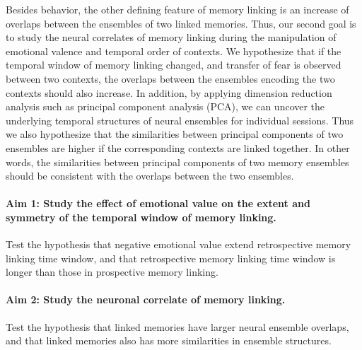 \documentclass[master.tex]{subfiles}
\begin{document}
Besides behavior, the other defining feature of memory linking is an increase of
overlaps between the ensembles of two linked memories. Thus, our second goal is
to study the neural correlates of memory linking during the manipulation of
emotional valence and temporal order of contexts. We hypothesize that if the
temporal window of memory linking changed, and transfer of fear is observed
between two contexts, the overlaps between the ensembles encoding the two
contexts should also increase. In addition, by applying dimension reduction
analysis such as principal component analysis (PCA), we can uncover the
underlying temporal structures of neural ensembles for individual sessions. Thus
we also hypothesize that the similarities between principal components of two
ensembles are higher if the corresponding contexts are linked together. In other
words, the similarities between principal components of two memory ensembles
should be consistent with the overlaps between the two ensembles.

\paragraph{Aim 1: Study the effect of emotional value on the extent and symmetry
  of the temporal window of memory linking.} Test the hypothesis that negative
emotional value extend retrospective memory linking time window, and that
retrospective memory linking time window is longer than those in prospective
memory linking.

\paragraph{Aim 2: Study the neuronal correlate of memory linking.} Test the
hypothesis that linked memories have larger neural ensemble overlaps, and that
linked memories also has more similarities in ensemble structures.

\newpage
\end{document}
